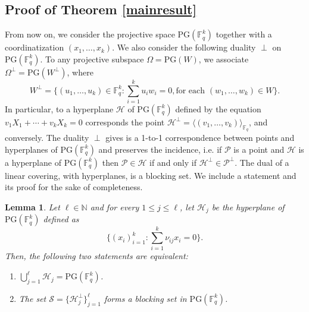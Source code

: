 \documentclass[12pt]{amsart}
\newtheorem{lemma}[theorem]{Lemma}
\newcommand{\F}{{\mathbb F}}
\newcommand{\fq}{{\mathbb F}_{q}}
\newcommand{\PG}{\mathrm{PG}}
\begin{document}
\subsection{Proof of Theorem \ref{mainresult}}

From now on, we consider the projective space $\PG(\F_q^k)$ together with a coordinatization $(x_1,\ldots,x_k)$. We also consider the following duality $\perp$ on $\PG(\F_q^k)$. To any projective subspace $\Omega=\PG(W)$, we associate $\Omega^{\perp}=\PG(W^{\perp})$, where \[W^{\perp}=\{(u_1,\ldots,u_k) \in \fq^k \colon \sum_{i=1}^k u_iw_i=0, \mbox{for each }(w_1,\ldots,w_k) \in W\}.\]In particular, to a hyperplane $\mathcal{H}$ of $\PG(\F_q^k)$ defined by the equation $v_1X_1+\cdots+v_kX_k=0$ corresponds the point $\mathcal{H}^{\perp}=\langle (v_1,\ldots,v_k) \rangle_{\fq}$, and conversely. The duality $\perp$ gives is a 1-to-1 correspondence between points and hyperplanes of $\PG(\F_q^k)$ and preserves the incidence, i.e. if $\mathcal{P}$ is a point and $\mathcal{H}$ is a hyperplane of $\PG(\F_q^k)$ then $\mathcal{P} \in \mathcal{H}$ if and only if $\mathcal{H}^{\perp} \in \mathcal{P}^{\perp}$. The dual of a linear covering, with hyperplanes, is a blocking set. We include a statement and its proof for the sake of completeness. 

\begin{lemma}
Let $\ell \in\mathbb{N}$ and for every $1 \leq j \leq \ell$, let $\mathcal{H}_{j}$ be the hyperplane of $\PG(\F_{q}^{k})$ defined as \[\big\{(x_{i})_{i=1}^{k} : \sum_{i=1}^{k} \nu_{ij}x_{i} = 0 \big\}.\] Then, the following two statements are equivalent:
\begin{enumerate}
    \item  $\bigcup_{j=1}^{\ell} \mathcal{H}_{j} = \PG(\F_{q}^{k})$.\\
    \item The set $\mathcal{S} = \{\mathcal{H}_{j}^{\perp}\}_{j=1}^{\ell}$ forms a blocking set in $\PG(\F_{q}^{k})$.   
\end{enumerate}
\label{coveringtoblocking}
\end{lemma}
\end{document}
